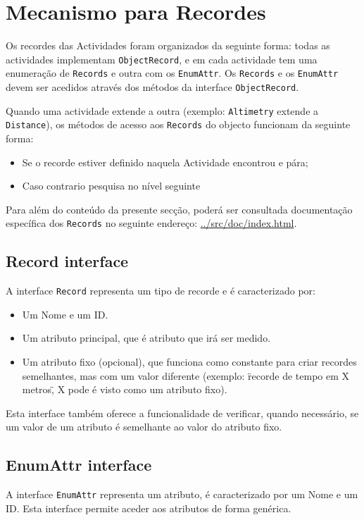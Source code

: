 \documentclass[a4paper,10pt]{report}
\begin{document}
\section{Mecanismo para Recordes}
\label{sec:record}
Os recordes das Actividades foram organizados da seguinte forma: todas as actividades implementam \verb!ObjectRecord!, e em cada actividade 
tem uma enumeração de \verb!Records! e outra com os \verb!EnumAttr!.
Os \verb!Records! e os \verb!EnumAttr! devem ser acedidos através dos métodos da interface \verb!ObjectRecord!.

Quando uma actividade extende a outra (exemplo: \verb!Altimetry! extende a \verb!Distance!), 
os métodos de acesso aos \verb!Records! do objecto funcionam da seguinte forma:
\begin{itemize}
 \item Se o recorde estiver definido naquela Actividade encontrou e pára;
 \item Caso contrario pesquisa no nível seguinte
\end{itemize}

Para além do conteúdo da presente secção, poderá ser consultada documentação específica dos \verb!Records! no seguinte endereço:
\url{../src/doc/index.html}.

\subsection{Record interface}
\label{subsec:record}
A interface \verb!Record! representa um tipo de recorde e é caracterizado por:
\begin{itemize}
 \item Um Nome e um ID. 
 \item Um atributo principal, que é atributo que irá ser medido.
 \item Um atributo fixo (opcional), que funciona como constante para criar recordes semelhantes, mas com um valor diferente 
	(exemplo: \"recorde de tempo em X metros\", X pode é visto como um atributo fixo).
\end{itemize}

Esta interface também oferece a funcionalidade de verificar, quando necessário, se um valor de um atributo é semelhante ao valor do atributo fixo.

\subsection{EnumAttr interface}
\label{subsec:enumAttr}
A interface \verb!EnumAttr! representa um atributo, é caracterizado por um Nome e um ID. 
Esta interface permite aceder aos atributos de forma genérica.
\end{document}
